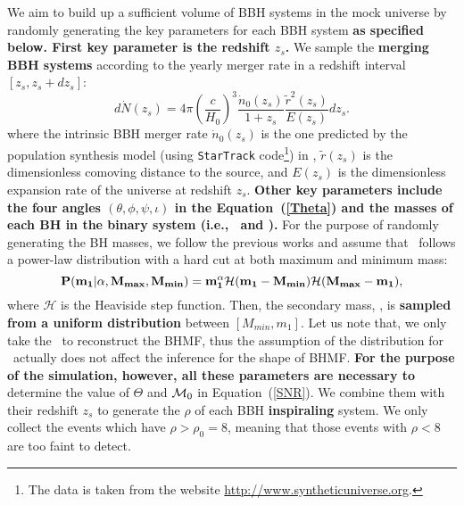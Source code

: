 \documentclass[twocolumn]{aastex62}
\begin{document}
We aim to build up a sufficient volume of BBH systems in the mock universe by randomly generating the key parameters for each BBH system \textbf{as specified below. First key parameter is the redshift $z_s$.}  We sample the \textbf{merging BBH systems} according to the yearly merger rate in a redshift interval  $[z_{s}, z_{s}+dz_{s}]$:
 \begin{equation}
 d\dot{N} (z_s)=4\pi\left(\frac{c}{H_{0}}\right)^3\frac{\dot{n}_{0}(z_{s})}{1+z_{s}}\frac{\tilde{r}^2(z_{s})}{E(z_{s})}dz_{s}. 
 \end{equation}
where the intrinsic BBH merger rate $\dot{n}_{0}(z_{s})$ is the one predicted by the population synthesis model (using {\tt StarTrack} code\footnote{The data is taken from the website \url{http://www.syntheticuniverse.org}.}) in \citet{Dominik13}, $\tilde{r}(z_{s})$ is the dimensionless comoving distance to the source, and $E (z_s)$ is
the dimensionless expansion rate of the universe at redshift $z_s$. 
{\bf Other key parameters include the four angles $(\theta, \phi, \psi, \iota)$ in the Equation~(\ref{Theta})  and the masses of each BH in the binary system (i.e., \mone\ and \mtwo).}
For the purpose of randomly generating the BH masses, we follow the previous works \citep{Kovetz2017PhRvD, Abbott2018b, Fishbach2018} and assume that \mone\ follows a power-law distribution with a hard cut at both maximum and minimum mass:
 \begin{equation} \label{equ_powlaw}
{\bf P(m_1|\alpha, M_{max}, M_{min}) = m_1^{\alpha} \mathcal{H}(m_1-M_{min}) \mathcal{H}(M_{max}-m_1),}
 \end{equation}
where $\mathcal{H}$ is the Heaviside step function. Then, the secondary mass, \mtwo, is %
\textbf{sampled from a uniform distribution} 
between $[M_{min}, m_1]$. Let us note that, we only take the \mone\ to reconstruct the BHMF, thus the assumption of the distribution for \mtwo\ actually does not affect the inference for the shape of BHMF. 
\textbf{For the purpose of the simulation, however, all these parameters are necessary to} determine the value of $\Theta$ and ${\cal M}_0$ in Equation~(\ref{SNR}). We combine them with their redshift $z_s$ to generate the $\rho$ of each BBH \textbf{inspiraling} system. We only collect the events which have $\rho > \rho_0 = 8$, meaning that those events with $\rho < 8$ are too faint to detect. 
\end{document}
